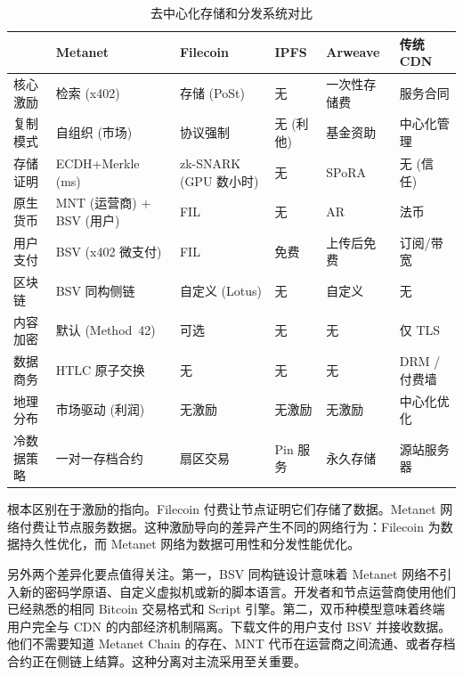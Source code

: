 \documentclass[11pt,a4paper]{article}
\begin{document}
\begin{table}[htbp]
\centering
\small
\setlength{\tabcolsep}{4pt}
\begin{tabularx}{\textwidth}{@{}l >{\raggedright\arraybackslash}X >{\raggedright\arraybackslash}X >{\raggedright\arraybackslash}X >{\raggedright\arraybackslash}X >{\raggedright\arraybackslash}X@{}}
\toprule
 & \textbf{Metanet} & \textbf{Filecoin} & \textbf{IPFS} & \textbf{Arweave} & \textbf{传统 CDN} \\
\midrule
核心激励 & 检索 (x402) & 存储 (PoSt) & 无 & 一次性存储费 & 服务合同 \\
\addlinespace
复制模式 & 自组织 (市场) & 协议强制 & 无 (利他) & 基金资助 & 中心化管理 \\
\addlinespace
存储证明 & ECDH+Merkle (ms) & zk-SNARK (GPU 数小时) & 无 & SPoRA & 无 (信任) \\
\addlinespace
原生货币 & MNT (运营商) + BSV (用户) & FIL & 无 & AR & 法币 \\
\addlinespace
用户支付 & BSV (x402 微支付) & FIL & 免费 & 上传后免费 & 订阅/带宽 \\
\addlinespace
区块链 & BSV 同构侧链 & 自定义 (Lotus) & 无 & 自定义 & 无 \\
\addlinespace
内容加密 & 默认 (Method~42) & 可选 & 无 & 无 & 仅 TLS \\
\addlinespace
数据商务 & HTLC 原子交换 & 无 & 无 & 无 & DRM / 付费墙 \\
\addlinespace
地理分布 & 市场驱动 (利润) & 无激励 & 无激励 & 无激励 & 中心化优化 \\
\addlinespace
冷数据策略 & 一对一存档合约 & 扇区交易 & Pin 服务 & 永久存储 & 源站服务器 \\
\bottomrule
\end{tabularx}
\caption{去中心化存储和分发系统对比}
\end{table}

根本区别在于激励的指向。Filecoin 付费让节点证明它们存储了数据。Metanet 网络付费让节点服务数据。这种激励导向的差异产生不同的网络行为：Filecoin 为数据持久性优化，而 Metanet 网络为数据可用性和分发性能优化。

另外两个差异化要点值得关注。第一，BSV 同构链设计意味着 Metanet 网络不引入新的密码学原语、自定义虚拟机或新的脚本语言。开发者和节点运营商使用他们已经熟悉的相同 Bitcoin 交易格式和 Script 引擎。第二，双币种模型意味着终端用户完全与 CDN 的内部经济机制隔离。下载文件的用户支付 BSV 并接收数据。他们不需要知道 Metanet Chain 的存在、MNT 代币在运营商之间流通、或者存档合约正在侧链上结算。这种分离对主流采用至关重要。

\end{document}
